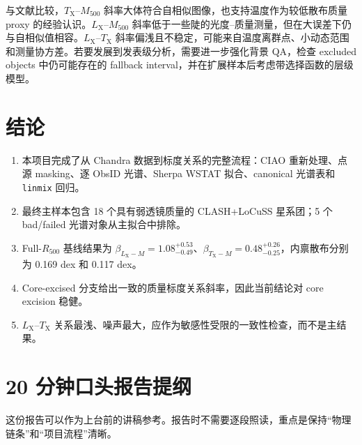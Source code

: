\documentclass[UTF8,11pt,fontset=none]{ctexart}
\newcommand{\Mfive}{\ensuremath{M_{500}}}
\newcommand{\Rfive}{\ensuremath{R_{500}}}
\newcommand{\Lx}{\ensuremath{L_{\mathrm{X}}}}
\newcommand{\Tx}{\ensuremath{T_{\mathrm{X}}}}
\begin{document}
与文献比较，\Tx--\Mfive{} 斜率大体符合自相似图像，也支持温度作为较低散布质量 proxy 的经验认识。\Lx--\Mfive{} 斜率低于一些陡的光度--质量测量，但在大误差下仍与自相似值相容。\Lx--\Tx{} 斜率偏浅且不稳定，可能来自温度离群点、小动态范围和测量协方差。若要发展到发表级分析，需要进一步强化背景 QA，检查 excluded objects 中仍可能存在的 fallback interval，并在扩展样本后考虑带选择函数的层级模型。

\section{结论}

\begin{enumerate}
\item 本项目完成了从 Chandra 数据到标度关系的完整流程：CIAO 重新处理、点源 masking、逐 ObsID 光谱、Sherpa WSTAT 拟合、canonical 光谱表和 \texttt{linmix} 回归。
\item 最终主样本包含 18 个具有弱透镜质量的 CLASH+LoCuSS 星系团；5 个 bad/failed 光谱对象从主拟合中排除。
\item Full-\Rfive{} 基线结果为 $\beta_{\Lx-M}=1.08^{+0.53}_{-0.49}$、$\beta_{\Tx-M}=0.48^{+0.26}_{-0.25}$，内禀散布分别为 0.169 dex 和 0.117 dex。
\item Core-excised 分支给出一致的质量标度关系斜率，因此当前结论对 core excision 稳健。
\item \Lx--\Tx{} 关系最浅、噪声最大，应作为敏感性受限的一致性检查，而不是主结果。
\end{enumerate}

\appendix
\section{20 分钟口头报告提纲}

这份报告可以作为上台前的讲稿参考。报告时不需要逐段照读，重点是保持“物理链条”和“项目流程”清晰。
\end{document}
